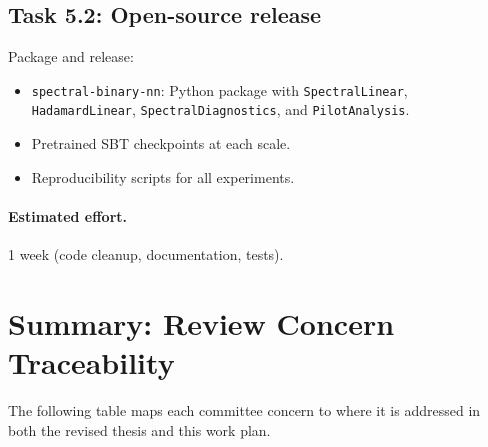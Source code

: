 \documentclass[12pt,a4paper]{article}
\begin{document}
\subsection{Task 5.2: Open-source release}

Package and release:
\begin{itemize}
    \item \texttt{spectral-binary-nn}: Python package with \texttt{SpectralLinear}, \texttt{HadamardLinear}, \texttt{SpectralDiagnostics}, and \texttt{PilotAnalysis}.
    \item Pretrained SBT checkpoints at each scale.
    \item Reproducibility scripts for all experiments.
\end{itemize}

\paragraph{Estimated effort.} 1 week (code cleanup, documentation, tests).


\section{Summary: Review Concern Traceability}\label{sec:traceability}

The following table maps each committee concern to where it is addressed in both the revised thesis and this work plan.
\end{document}
